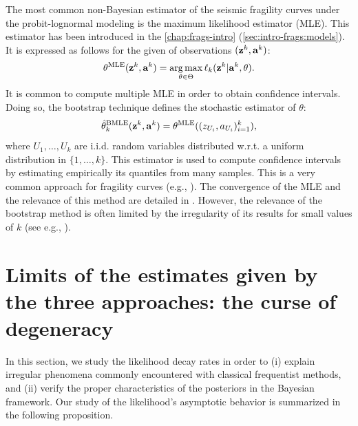 The most common non-Bayesian estimator of the seismic fragility curves under the probit-lognormal modeling is the maximum likelihood estimator (MLE). This estimator has been introduced in the \cref{chap:frags-intro} (\cref{sec:intro-frags:models}). It is expressed as follows for the given of observations $(\mathbf{z}^k,\mathbf{a}^k)$:
    \begin{equation}
        \theta^{\text{MLE}}(\mathbf{z}^k,\mathbf{a}^k)=\operatorname*{arg\,max}_{\theta\in\Theta}\ell_k(\mathbf{z}^k|\mathbf{a}^k,\theta).
    \end{equation}
It is common to compute multiple MLE in order to obtain confidence intervals. Doing so, the bootstrap technique defines the stochastic estimator of $\theta$:
    \begin{equation}
        \hat\theta_k^{\text{BMLE}}(\mathbf{z}^k,\mathbf{a}^k) = \theta^{\text{MLE}}((z_{U_i},a_{U_i})_{i=1}^k),
    \end{equation}    
  where $U_1,\dots,U_k$ are i.i.d. random variables distributed w.r.t. a uniform distribution in $\{1,\dots,k\}$.
This estimator is used to compute confidence intervals by estimating empirically its quantiles from many samples. 
This is a very common approach for fragility curves (e.g., 
\cite{shinozuka_statistical_2000,gehl_influence_2015,baker_efficient_2015}). The convergence of the MLE and the relevance of this method are detailed in \cite{van_der_vaart_asymptotic_1992}. However, the relevance of the bootstrap method is often limited by the irregularity of its results for small values of $k$ (see e.g., \cite{zentner_fragility_2017}).





\section{Limits of the estimates given by the three approaches: the curse of degeneracy}\label{sec:PREM:degeneracy}

In this section, we study the likelihood decay rates in order to (i) explain irregular phenomena commonly encountered with classical frequentist methods, and (ii) verify the proper characteristics of the posteriors in the Bayesian framework.
Our study of the likelihood's asymptotic behavior is summarized in the following proposition.

